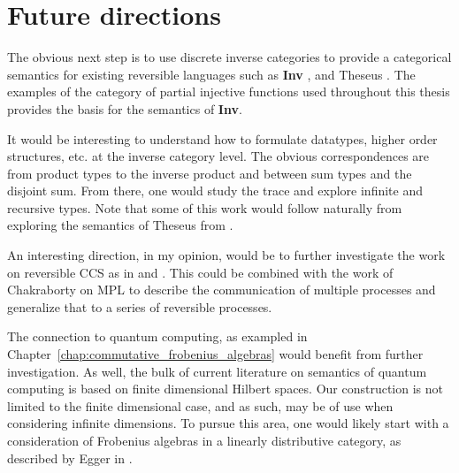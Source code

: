 \section{Future directions}
\label{sec:whither-next}

The obvious next step is to use discrete inverse categories to provide a categorical semantics for
existing reversible languages such as \textbf{Inv} \cite{muetal04:injreversible}, and Theseus
\cite{james2013isomorphic,james2012information}. The examples of the category of partial injective
functions used throughout this thesis provides the basis for the semantics of \textbf{Inv}.

It would be interesting to understand how to formulate datatypes, higher order structures, etc. at the
inverse category level. The obvious correspondences are from product types to the inverse product and
between sum types and the disjoint sum. From there, one would study the trace and explore infinite
and recursive types. Note that some of this work would follow naturally from exploring the semantics
of Theseus from \cite{james2013isomorphic,james2012information}.

An interesting direction, in my opinion, would be to further investigate the work on reversible
CCS as in \cite{danos2004reversible} and \cite{phillips2006operational}. This could be combined with
the work of Chakraborty on MPL \cite{chakraborty2014} to describe the communication of multiple
processes and generalize that to a series of reversible processes.


The connection to quantum computing, as exampled in
Chapter~\ref{chap:commutative_frobenius_algebras} would benefit from further investigation. As well,
the bulk of current literature on semantics of quantum computing is based on finite dimensional
Hilbert spaces. Our construction is not limited to the finite dimensional
case, and as such, may be of use when considering infinite dimensions. To pursue this area, one
would likely start with a consideration of Frobenius algebras in a linearly distributive category,
as described by Egger in \cite{egger2010frobenius}.


